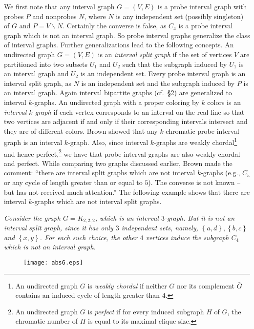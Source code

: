 \documentclass[secthm]{elsart}
\newcommand{\set}[1]{\left\{#1\right\}}
\begin{document}
We first note that any interval graph $G=(V,E)$ is a probe interval graph with probes $P$ and nonprobes $N$, where $N$ is any independent set (possibly singleton) of $G$ and $P=V\smallsetminus N$. Certainly the converse is false, as $C_4$ is a probe interval graph which is not an interval graph. So probe interval graphs generalize the class of interval graphs. Further generalizations lead to the following concepts. An undirected graph $G=(V,E)$ is an {\em{interval split graph}} \cite{Br} if the set of vertices $V$ are partitioned into two subsets $U_1$ and $U_2$ such that the subgraph induced by $U_1$ is an interval graph and $U_2$ is an independent set. Every probe interval graph is an interval split graph, as $N$ is an independent set and the subgraph induced by $P$ is an interval graph. Again interval bipartite graphs (cf.~\S 2) are generalized to interval $k$-graphs. An undirected graph with a proper coloring by $k$ colors is an {\em{interval $k$-graph}} \cite{Br} if each vertex corresponds to an interval on the real line so that two vertices are adjacent if and only if their corresponding intervals intersect and they are of different colors. Brown \cite{Br} showed that any $k$-chromatic probe interval graph is an interval $k$-graph. Also, since interval $k$-graphs are weakly chordal\footnote{An undirected graph $G$ is {\em weakly chordal} if neither $G$ nor its complement $\bar{G}$ contains an induced cycle of length greater than $4$.} and hence perfect,\footnote{An undirected graph $G$ is {\em perfect} if for every induced subgraph $H$ of $G$, the chromatic number of $H$ is equal to its maximal clique size.} we have that probe interval graphs are also weakly chordal and perfect. While comparing two graphs discussed earlier, Brown \cite{Br} made the comment:
``there are interval split graphs which are not interval $k$-graphs (e.g., $C_5$ or any cycle of length greater than or equal to $5$). The converse is not known -- but has not received much attention.'' The following example shows that there are interval $k$-graphs which are not interval split graphs.

\begin{exmp} {\em Consider the graph $G=K_{2,2,2}$, which is an interval $3$-graph. But it is not an interval split graph, since it has only $3$ independent sets, namely, $\set{a,d},\set{b,c}$ and $\set{x,y}$. For each such choice, the other $4$ vertices induce the subgraph $C_4$ which is not an interval graph.}

\begin{figure}[h]
\begin{center}
\texttt{[image: abs6.eps]}
\end{center}
\end{figure}
\end{exmp}
\end{document}
